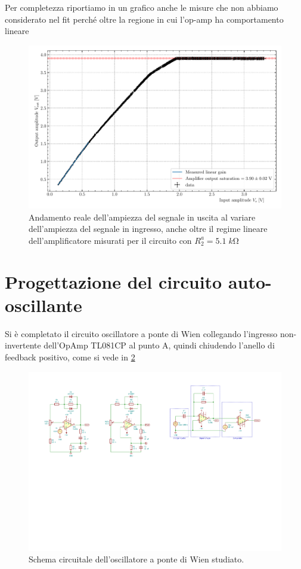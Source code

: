 \documentclass[10pt, a4paper, italian]{article}
\begin{document}
Per completezza riportiamo in un grafico anche le misure che non abbiamo
considerato nel fit perché oltre la regione in cui l'op-amp ha comportamento
lineare
\begin{figure}[htbp]
\centering
\includegraphics[scale=0.7]{VoutVs}
\caption{Andamento reale dell'ampiezza del segnale in uscita al variare
dell'ampiezza del segnale in ingresso, anche oltre il regime lineare
dell'amplificatore misurati per il circuito con $R_2^a = 5.1 \; \si{k\ohm}$
\label{fig: gainsat}}
\end{figure}

\section{Progettazione del circuito auto-oscillante}
Si è completato il circuito oscillatore a ponte di Wien collegando
l'ingresso non-invertente dell'OpAmp TL081CP al punto A, quindi chiudendo
l'anello di feedback positivo, come si vede in \cref{fig: wienschm}
\begin{figure}[htbp]
    \centering
	\includegraphics[scale=1.2]{wienschm}
    \caption{Schema circuitale dell'oscillatore a ponte di Wien studiato.
    \label{fig: wienschm}}
\end{figure}
\end{document}
